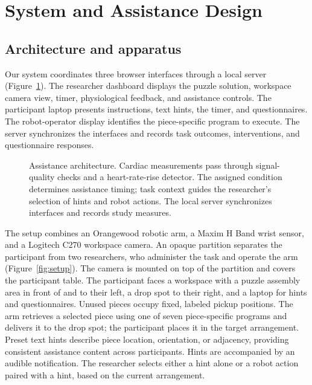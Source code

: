 \documentclass[sigconf,anonymous]{aamas}
\begin{document}
\section{System and Assistance Design}

\subsection{Architecture and apparatus}

Our system coordinates three browser interfaces through a local server (Figure~\ref{fig:architecture}). The researcher dashboard displays the puzzle solution, workspace camera view, timer, physiological feedback, and assistance controls. The participant laptop presents instructions, text hints, the timer, and questionnaires. The robot-operator display identifies the piece-specific program to execute. The server synchronizes the interfaces and records task outcomes, interventions, and questionnaire responses.

\begin{figure}[t]
\centering
\begingroup
\resizebox{.96\textwidth}{!}{}
\endgroup
\caption{Assistance architecture. Cardiac measurements pass through signal-quality checks and a heart-rate-rise detector. The assigned condition determines assistance timing; task context guides the researcher’s selection of hints and robot actions. The local server synchronizes interfaces and records study measures.}
\label{fig:architecture}
\end{figure}

The setup combines an Orangewood robotic arm, a Maxim H Band wrist sensor, and a Logitech C270 workspace camera. An opaque partition separates the participant from two researchers, who administer the task and operate the arm (Figure~\ref{fig:setup}). The camera is mounted on top of the partition and covers the participant table. The participant faces a workspace with a puzzle assembly area in front of and to their left, a drop spot to their right, and a laptop for hints and questionnaires. Unused pieces occupy fixed, labeled pickup positions. The arm retrieves a selected piece using one of seven piece-specific programs and delivers it to the drop spot; the participant places it in the target arrangement. Preset text hints describe piece location, orientation, or adjacency, providing consistent assistance content across participants. Hints are accompanied by an audible notification. The researcher selects either a hint alone or a robot action paired with a hint, based on the current arrangement.
\end{document}
